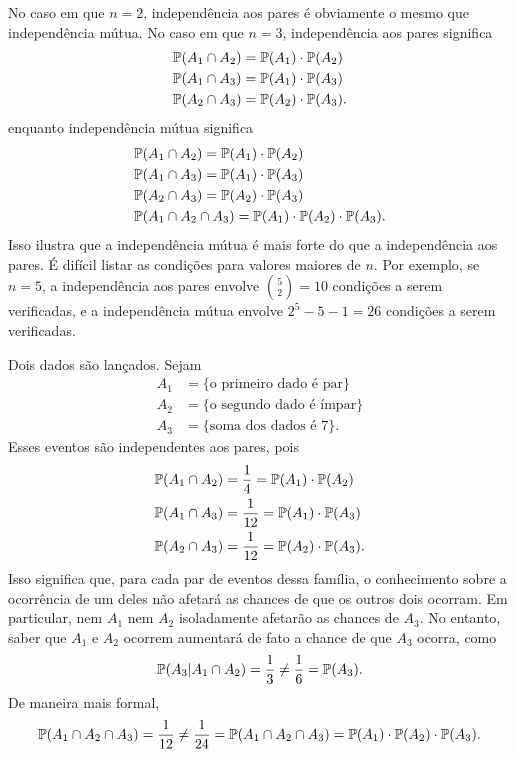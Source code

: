 No caso em que $ n = 2 $, independência aos pares é obviamente o mesmo que independência mútua.
No caso em que $ n = 3 $, independência aos pares significa
\begin{align}
&
\mathbb{P}(A_1 \cap A_2) = \mathbb{P}(A_1) \cdot \mathbb{P}(A_2)
\\
&
\mathbb{P}(A_1 \cap A_3) = \mathbb{P}(A_1) \cdot \mathbb{P}(A_3)
\\
&
\mathbb{P}(A_2 \cap A_3) = \mathbb{P}(A_2) \cdot \mathbb{P}(A_3)
.
\end{align}
enquanto independência mútua significa
\begin{align}
&
\mathbb{P}(A_1 \cap A_2) = \mathbb{P}(A_1) \cdot \mathbb{P}(A_2)
\\
&
\mathbb{P}(A_1 \cap A_3) = \mathbb{P}(A_1) \cdot \mathbb{P}(A_3)
\\
&
\mathbb{P}(A_2 \cap A_3) = \mathbb{P}(A_2) \cdot \mathbb{P}(A_3)
\\
&
\mathbb{P}(A_1 \cap A_2 \cap A_3) = \mathbb{P}(A_1) \cdot \mathbb{P}(A_2) \cdot \mathbb{P}(A_3)
.
\end{align}
Isso ilustra que a independência mútua é mais forte do que a independência aos pares.
É difícil listar as condições para valores maiores de $ n $.
Por exemplo, se $ n = 5 $, a independência aos pares envolve $ \binom{5}{2} = 10 $ condições a serem verificadas, e a independência mútua envolve $ 2^5-5-1 = 26 $ condições a serem verificadas.

\begin{example}
Dois dados são lançados. Sejam
\begin{align}
A_1 &= \{ \text{o primeiro dado é par} \} \\
A_2 &= \{ \text{o segundo dado é ímpar} \} \\
A_3 &= \{ \text{soma dos dados é } 7\}.
\end{align}
Esses eventos são independentes aos pares, pois
\begin{align}
&
\mathbb{P}(A_1 \cap A_2) = \frac{1}{4} = \mathbb{P}(A_1) \cdot \mathbb{P}(A_2)
\\
&
\mathbb{P}(A_1 \cap A_3) = \frac{1}{12} = \mathbb{P}(A_1) \cdot \mathbb{P}(A_3)
\\
&
\mathbb{P}(A_2 \cap A_3) = \frac{1}{12} = \mathbb{P}(A_2) \cdot \mathbb{P}(A_3)
.
\end{align}
Isso significa que, para cada par de eventos dessa família, o conhecimento sobre a ocorrência de um deles não afetará as chances de que os outros dois ocorram.
Em particular, nem $ A_1 $ nem $ A_2 $ isoladamente afetarão as chances de $ A_3 $.
No entanto, saber que $ A_1 $ e $ A_2 $ ocorrem aumentará de fato a chance de que $ A_3 $ ocorra, como
\[
\mathbb{P}(A_3 | A_1 \cap A_2) = \frac{1}{3} \ne \frac{1}{6} = \mathbb{P}(A_3)
.
\]
De maneira mais formal,
\[
\mathbb{P}(A_1 \cap A_2 \cap A_3) = \frac{1}{12} \ne \frac{1}{24} =
\mathbb{P}(A_1 \cap A_2 \cap A_3) = \mathbb{P}(A_1) \cdot \mathbb{P}(A_2) \cdot \mathbb{P}(A_3)
.
\]
\end{example}

